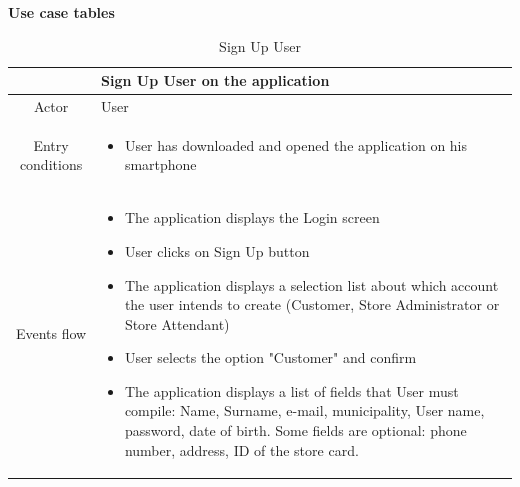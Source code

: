 \documentclass[table, 12pt]{article}
\begin{document}
\begin{minipage}{\textwidth}
    \textbf{Use case tables}\\
    \begin{longtable}{ | c | p{10cm} | }
        \caption{Sign Up User}                                                                                                                                                                                                                                                                    \\

        \hline
                         & Sign Up User on the application                                                                                                                                                                                                                                        \\
        \hline
        Actor            & User                                                                                                                                                                                                                                                                   \\
        \hline
        Entry conditions &
        \begin{itemize}
            \item User has downloaded and opened the application on his smartphone
        \end{itemize}                                                                                                                                                                                                                                                                \\
        \hline
        Events flow      & \begin{itemize}[nosep,after=\strut]
            \item The application displays the Login screen
            \item User clicks on Sign Up button
            \item The application displays a selection list about which account the user intends to create (Customer, Store Administrator or Store Attendant)
            \item User selects the option "Customer" and confirm
            \item The application displays a list of fields that User must compile: Name, Surname, e-mail, municipality, User name, password, date of birth. Some fields are optional: phone number, address, ID of the store card.

\end{itemize}
\end{longtable}
\end{minipage}
\end{document}
